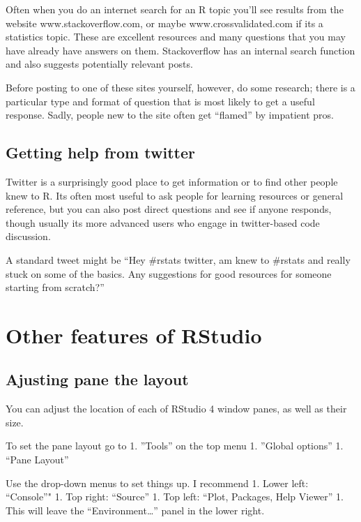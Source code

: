 \documentclass[]{book}
\theoremstyle{definition}
\theoremstyle{definition}
\theoremstyle{definition}
\theoremstyle{remark}
\begin{document}
Often when you do an internet search for an R topic you'll see results
from the website www.stackoverflow.com, or maybe www.crossvalidated.com
if its a statistics topic. These are excellent resources and many
questions that you may have already have answers on them. Stackoverflow
has an internal search function and also suggests potentially relevant
posts.

Before posting to one of these sites yourself, however, do some
research; there is a particular type and format of question that is most
likely to get a useful response. Sadly, people new to the site often get
``flamed'' by impatient pros.

\subsection{Getting help from twitter}\label{getting-help-from-twitter}

Twitter is a surprisingly good place to get information or to find other
people knew to R. Its often most useful to ask people for learning
resources or general reference, but you can also post direct questions
and see if anyone responds, though usually its more advanced users who
engage in twitter-based code discussion.

A standard tweet might be ``Hey \#rstats twitter, am knew to \#rstats
and really stuck on some of the basics. Any suggestions for good
resources for someone starting from scratch?''

\section{Other features of RStudio}\label{other-features-of-rstudio}

\subsection{Ajusting pane the layout}\label{ajusting-pane-the-layout}

You can adjust the location of each of RStudio 4 window panes, as well
as their size.

To set the pane layout go to 1. ''Tools'' on the top menu 1. ''Global
options'' 1. ``Pane Layout''

Use the drop-down menus to set things up. I recommend 1. Lower left:
``Console''" 1. Top right: ``Source'' 1. Top left: ``Plot, Packages,
Help Viewer'' 1. This will leave the ``Environment\ldots{}'' panel in
the lower right.
\end{document}
